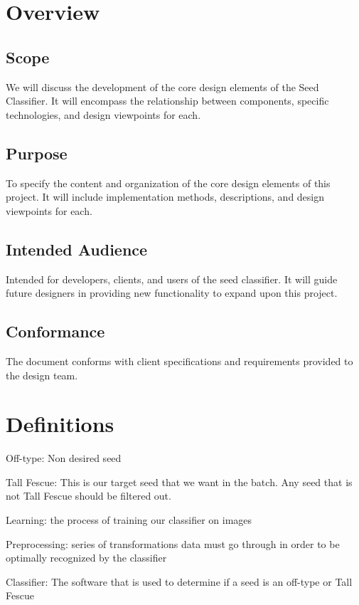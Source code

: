 \documentclass[onecolumn, draftclsnofoot,10pt, compsoc]{IEEEtran}
\begin{document}

\section{Overview}

\subsection{Scope}
We will discuss the development of the core design elements of the Seed Classifier. It will encompass the relationship between components, specific technologies, and design viewpoints for each.

\subsection{Purpose}
To specify the content and organization of the core design elements of this project. It will include implementation methods, descriptions, and design viewpoints for each. 

\subsection{Intended Audience}
Intended for developers, clients, and users of the seed classifier. It will guide future designers in providing new functionality to expand upon this project.

\subsection{Conformance}
The document conforms with client specifications and requirements provided to the design team.

\section{Definitions}

Off-type: Non desired seed

Tall Fescue: This is our target seed that we want in the batch. Any seed that is not Tall Fescue should be filtered out.

Learning: the process of training our classifier on images

Preprocessing: series of transformations data must go through in order to be optimally recognized by the classifier

Classifier: The software that is used to determine if a seed is an off-type or Tall Fescue
\end{document}
